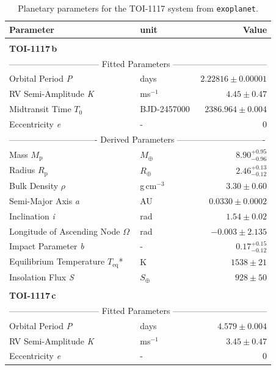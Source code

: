 \documentclass[fleqn,usenatbib,useAMS]{mnras}
\begin{document}
\begin{table}
 \caption{Planetary parameters for the TOI-1117 system from \texttt{exoplanet}.}
 \label{tab:planets}
  \begin{tabular}{llr}
   \hline
   Parameter & unit & Value \\
   \hline\\
   {\textbf{TOI-1117\,b}}\\
   \multicolumn{3}{l}{-------------------------------- Fitted Parameters ---------------------------------}\\[2pt]
   Orbital Period \textit{P} & days & $2.22816\pm0.00001$\\
   RV Semi-Amplitude \textit{K} & ms$^{-1}$  & $4.45\pm0.47$\\
   Midtransit Time $T_0$& BJD-2457000 & $2386.964\pm0.004$\\
   Eccentricity \textit{e} & - & 0\\
   \multicolumn{3}{l}{------------------------------- Derived Parameters -------------------------------}\\[2pt]
   Mass $M_\text{p}$ & $M_\oplus$ & $8.90^{+0.95}_{-0.96}$\\[2pt]
   Radius $R_\text{p}$ & $R_\oplus$ & $2.46^{+0.13}_{-0.12}$\\
   Bulk Density $\rho$ & g\,cm$^{-3}$ & $3.30\pm0.60$\\
   Semi-Major Axis \textit{a} & AU & $0.0330\pm0.0002$\\
   Inclination \textit{i} & rad & $1.54\pm{0.02}$\\
   Longitude of Ascending Node $\Omega$ & rad & $-0.003\pm{2.135}$\\
   Impact Parameter \textit{b} & - & $0.17^{+0.15}_{-0.12}$\\
   Equilibrium Temperature $T_\text{eq}$* & K & $1538\pm21$\\
   Insolation Flux \textit{S} & $S_\oplus$ & $928\pm50$\\
   \\{\textbf{TOI-1117\,c}} \\
   \multicolumn{3}{l}{-------------------------------- Fitted Parameters ---------------------------------}\\[2pt]
   Orbital Period \textit{P} & days & $4.579\pm0.004$\\
   RV Semi-Amplitude \textit{K} & ms$^{-1}$ & $3.45\pm0.47$\\
   Eccentricity \textit{e} & - & 0\\

\end{tabular}
\end{table}
\end{document}
